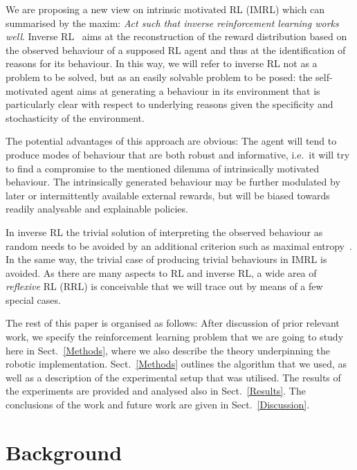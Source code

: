 \documentclass{article}
\begin{document}
We are proposing a new view on intrinsic motivated RL (IMRL) which can summarised by the 
maxim: \emph{Act such that inverse reinforcement learning works well}. 
Inverse RL~\cite{ng2000algorithms} aims at the reconstruction of the reward distribution based
on the observed behaviour of a supposed RL agent and thus at the identification of reasons 
for its behaviour. In this way, we will refer to inverse RL not as a problem to be solved, 
but as an easily solvable problem to be posed: 
the self-motivated agent aims at generating a behaviour in its environment that 
is particularly clear with respect to underlying reasons given the specificity and 
stochasticity of the environment. 

The potential advantages of this approach are obvious: The
agent will tend to produce modes of behaviour that are both robust and informative, i.e.~it
will try to find a compromise to the mentioned dilemma of intrinsically motivated behaviour.
The intrinsically generated behaviour may be further modulated by later or intermittently 
available external rewards, but will be biased towards readily analysable and explainable
policies. 

In inverse RL the trivial solution of interpreting the observed behaviour as random 
needs to be avoided by an additional criterion such as maximal entropy~\cite{ziebart2008maximum}. 
In the same way, the trivial case of producing trivial behaviours in IMRL is avoided.
As there are many aspects to RL and inverse RL, a wide area of \emph{reflexive} RL (RRL) is 
conceivable that we will trace out by means of a few special cases.


The rest of this paper is organised as follows: After discussion of prior relevant work, we specify the reinforcement learning problem that we are going to study here in 	Sect.~\ref{Methods}, where we also describe the theory underpinning the robotic implementation. Sect.~\ref{Methods} outlines the algorithm that we used, as well as a description of the experimental setup that was utilised. The results of the experiments are provided and analysed also in Sect.~\ref{Results}. The conclusions of the work and future work are given in Sect.~\ref{Discussion}.


\section{Background}
\end{document}
